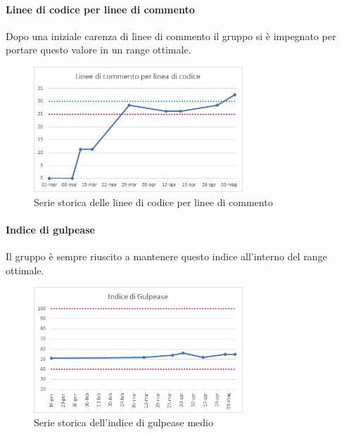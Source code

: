     \paragraph{Linee di codice per linee di commento} \Spazio
    Dopo una iniziale carenza di linee di commento il gruppo si è impegnato per portare questo valore in un range ottimale.
    \begin{figure}[H]
    	\centering 
    	\includegraphics[width=0.7\textwidth]{Images/commento.png}
    	\caption{Serie storica delle linee di codice per linee di commento}
    	\label{comm} 
    \end{figure}
    \paragraph{Indice di gulpease} \Spazio
    Il gruppo è sempre riuscito a mantenere questo indice all'interno del range ottimale.
    \begin{figure}[H]
    	\centering 
    	\includegraphics[width=0.7\textwidth]{Images/Gulpease.png}
    	\caption{Serie storica dell'indice di gulpease medio}
    	\label{gul} 
    \end{figure}
